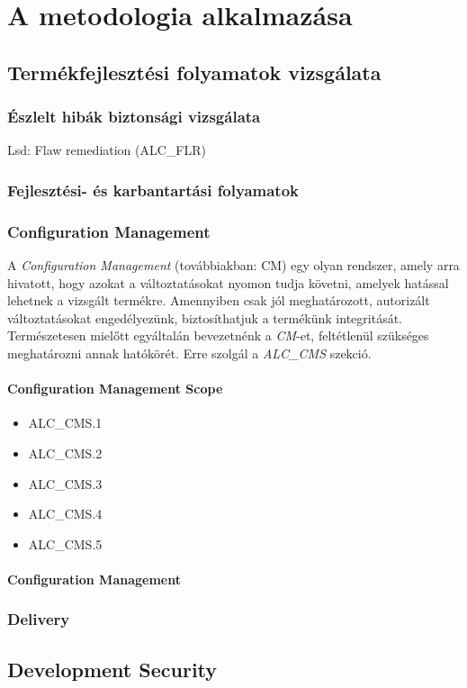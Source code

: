 \chapter{A metodologia alkalmazása}

\section{Termékfejlesztési folyamatok vizsgálata}
\subsection{Észlelt hibák biztonsági vizsgálata}

Lsd: Flaw remediation (ALC\_FLR)

\subsection{Fejlesztési- és karbantartási folyamatok}

\subsection{Configuration Management}
A \emph{Configuration Management} (továbbiakban: CM) egy olyan rendszer, amely arra hivatott,
hogy azokat a változtatásokat nyomon tudja követni, amelyek hatással lehetnek a vizsgált termékre.
Amennyiben csak jól meghatározott, autorizált változtatásokat engedélyezünk, biztosíthatjuk a
termékünk integritását.
Természetesen mielőtt egyáltalán bevezetnénk a \emph{CM}-et, feltétlenül szükséges meghatározni
annak hatókörét. Erre szolgál a \emph{ALC\_CMS} szekció.

\subsubsection{Configuration Management Scope}
\begin{itemize}
    \item{ALC\_CMS.1}
    \item{ALC\_CMS.2}
    \item{ALC\_CMS.3}
    \item{ALC\_CMS.4}
    \item{ALC\_CMS.5}
\end{itemize}

\subsubsection{Configuration Management}
\begin{itemize}
\end{itemize}

\subsection{Delivery}

\section{Development Security}

